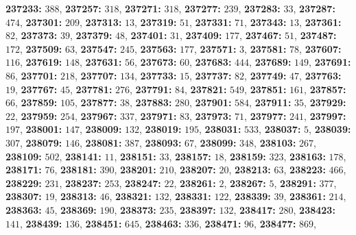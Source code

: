 \textsf{\bfseries 237233:} $388$, \textsf{\bfseries 237257:} $318$, \textsf{\bfseries 237271:} $318$, \textsf{\bfseries 237277:} $239$, \textsf{\bfseries 237283:} $33$, \textsf{\bfseries 237287:} $474$, \textsf{\bfseries 237301:} $209$, \textsf{\bfseries 237313:} $13$, \textsf{\bfseries 237319:} $51$, \textsf{\bfseries 237331:} $71$, \textsf{\bfseries 237343:} $13$, \textsf{\bfseries 237361:} $82$, \textsf{\bfseries 237373:} $39$, \textsf{\bfseries 237379:} $48$, \textsf{\bfseries 237401:} $31$, \textsf{\bfseries 237409:} $177$, \textsf{\bfseries 237467:} $51$, \textsf{\bfseries 237487:} $172$, \textsf{\bfseries 237509:} $63$, \textsf{\bfseries 237547:} $245$, \textsf{\bfseries 237563:} $177$, \textsf{\bfseries 237571:} $3$, \textsf{\bfseries 237581:} $78$, \textsf{\bfseries 237607:} $116$, \textsf{\bfseries 237619:} $148$, \textsf{\bfseries 237631:} $56$, \textsf{\bfseries 237673:} $60$, \textsf{\bfseries 237683:} $444$, \textsf{\bfseries 237689:} $149$, \textsf{\bfseries 237691:} $86$, \textsf{\bfseries 237701:} $218$, \textsf{\bfseries 237707:} $134$, \textsf{\bfseries 237733:} $15$, \textsf{\bfseries 237737:} $82$, \textsf{\bfseries 237749:} $47$, \textsf{\bfseries 237763:} $19$, \textsf{\bfseries 237767:} $45$, \textsf{\bfseries 237781:} $276$, \textsf{\bfseries 237791:} $84$, \textsf{\bfseries 237821:} $549$, \textsf{\bfseries 237851:} $161$, \textsf{\bfseries 237857:} $66$, \textsf{\bfseries 237859:} $105$, \textsf{\bfseries 237877:} $38$, \textsf{\bfseries 237883:} $280$, \textsf{\bfseries 237901:} $584$, \textsf{\bfseries 237911:} $35$, \textsf{\bfseries 237929:} $22$, \textsf{\bfseries 237959:} $254$, \textsf{\bfseries 237967:} $337$, \textsf{\bfseries 237971:} $83$, \textsf{\bfseries 237973:} $71$, \textsf{\bfseries 237977:} $241$, \textsf{\bfseries 237997:} $197$, \textsf{\bfseries 238001:} $147$, \textsf{\bfseries 238009:} $132$, \textsf{\bfseries 238019:} $195$, \textsf{\bfseries 238031:} $533$, \textsf{\bfseries 238037:} $5$, \textsf{\bfseries 238039:} $307$, \textsf{\bfseries 238079:} $146$, \textsf{\bfseries 238081:} $387$, \textsf{\bfseries 238093:} $67$, \textsf{\bfseries 238099:} $348$, \textsf{\bfseries 238103:} $267$, \textsf{\bfseries 238109:} $502$, \textsf{\bfseries 238141:} $11$, \textsf{\bfseries 238151:} $33$, \textsf{\bfseries 238157:} $18$, \textsf{\bfseries 238159:} $323$, \textsf{\bfseries 238163:} $178$, \textsf{\bfseries 238171:} $76$, \textsf{\bfseries 238181:} $390$, \textsf{\bfseries 238201:} $210$, \textsf{\bfseries 238207:} $20$, \textsf{\bfseries 238213:} $63$, \textsf{\bfseries 238223:} $466$, \textsf{\bfseries 238229:} $231$, \textsf{\bfseries 238237:} $253$, \textsf{\bfseries 238247:} $22$, \textsf{\bfseries 238261:} $2$, \textsf{\bfseries 238267:} $5$, \textsf{\bfseries 238291:} $377$, \textsf{\bfseries 238307:} $19$, \textsf{\bfseries 238313:} $46$, \textsf{\bfseries 238321:} $132$, \textsf{\bfseries 238331:} $122$, \textsf{\bfseries 238339:} $39$, \textsf{\bfseries 238361:} $214$, \textsf{\bfseries 238363:} $45$, \textsf{\bfseries 238369:} $190$, \textsf{\bfseries 238373:} $235$, \textsf{\bfseries 238397:} $132$, \textsf{\bfseries 238417:} $280$, \textsf{\bfseries 238423:} $141$, \textsf{\bfseries 238439:} $136$, \textsf{\bfseries 238451:} $645$, \textsf{\bfseries 238463:} $336$, \textsf{\bfseries 238471:} $96$, \textsf{\bfseries 238477:} $869$, 
